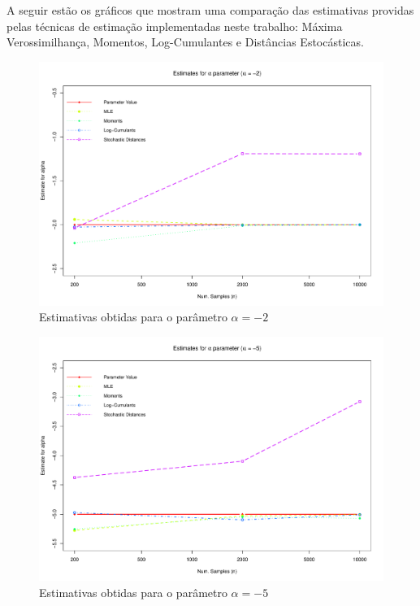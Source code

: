 \documentclass[12pt]{article}
\begin{document}
A seguir estão os gráficos que mostram uma comparação das estimativas providas pelas técnicas de estimação implementadas neste trabalho: Máxima Verossimilhança, Momentos, Log-Cumulantes e Distâncias Estocásticas.
\begin{figure}[H]
     \centering
     \includegraphics[scale=0.5]{plots/ComparisonAlpha-2.pdf}
     \caption{Estimativas obtidas para o parâmetro $\alpha = -2$}
     \label{graf_5}
\end{figure}
\begin{figure}[H]
     \centering
     \includegraphics[scale=0.5]{plots/ComparisonAlpha-5.pdf}
     \caption{Estimativas obtidas para o parâmetro $\alpha = -5$}
     \label{graf_6}
\end{figure}
\end{document}
